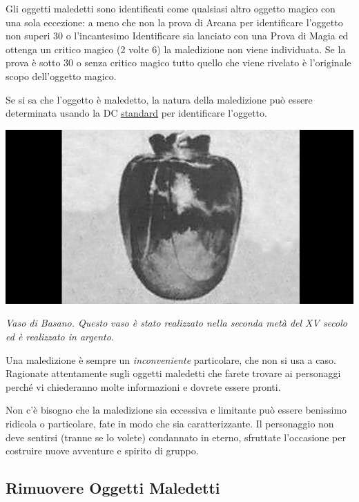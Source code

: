 \begin{multicols}{2}
\medskip

Gli oggetti maledetti sono \hypertarget{oggettimaledettiid}{identificati} come qualsiasi altro oggetto magico con una sola eccezione: a meno che non la prova di Arcana per identificare l'oggetto non superi 30 o l'incantesimo Identificare sia lanciato con una Prova di Magia ed ottenga un critico magico (2 volte 6) la maledizione non viene individuata. Se la prova è sotto 30 o senza critico magico tutto quello che viene rivelato è l'originale scopo dell'oggetto magico.

Se si sa che l'oggetto è maledetto, la natura della maledizione può essere determinata usando la DC \hyperlink{identificareom}{standard} per identificare l'oggetto.

\begin{center}
\includegraphics[width=0.75\linewidth]{immagini/vasobasano.png}

\textit{Vaso di Basano. Questo vaso è stato realizzato nella seconda metà del XV secolo ed è realizzato in argento.}
\end{center}


\begin{changemargin}{0.3cm}{0.3cm}\begin{narratore}
Una maledizione è sempre un \textit{inconveniente} particolare, che non si usa a caso. Ragionate attentamente sugli oggetti maledetti che farete trovare ai personaggi perché vi chiederanno molte informazioni e dovrete essere pronti.

Non c'è bisogno che la maledizione sia eccessiva e limitante può essere benissimo ridicola o particolare, fate in modo che sia caratterizzante. Il personaggio non deve sentirsi (tranne se lo volete) condannato in eterno, sfruttate l'occasione per costruire nuove avventure e spirito di gruppo.
\end{narratore}\end{changemargin}


\subsection{Rimuovere Oggetti Maledetti}


\end{multicols}
